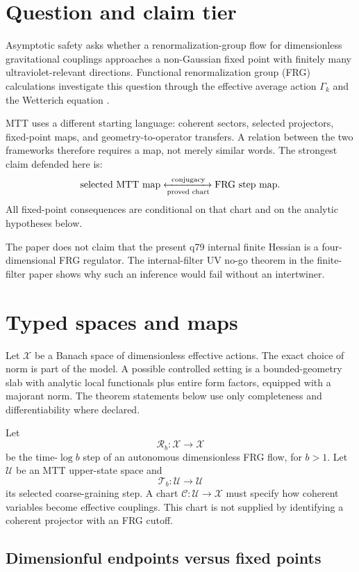 \documentclass[11pt]{article}
\theoremstyle{definition}
\theoremstyle{remark}
\newcommand{\X}{\mathcal X}
\newcommand{\U}{\mathcal U}
\newcommand{\Rmap}{\mathcal R}
\newcommand{\Tmap}{\mathcal T}
\newcommand{\Cmap}{\mathcal C}
\begin{document}
\tableofcontents

\section{Question and claim tier}

Asymptotic safety asks whether a renormalization-group flow for
dimensionless gravitational couplings approaches a non-Gaussian fixed point
with finitely many ultraviolet-relevant directions. Functional
renormalization group (FRG) calculations investigate this question through
the effective average action \(\Gamma_k\) and the Wetterich equation
\cite{Wetterich,Reuter,ReuterSaueressig}.

MTT uses a different starting language: coherent sectors, selected
projectors, fixed-point maps, and geometry-to-operator transfers. A relation
between the two frameworks therefore requires a map, not merely similar
words. The strongest claim defended here is:
\[
\text{selected MTT map}
\xleftrightarrow[\text{proved chart}]{\text{conjugacy}}
\text{FRG step map}.
\]
All fixed-point consequences are conditional on that chart and on the
analytic hypotheses below.

The paper does not claim that the present q79 internal finite Hessian is a
four-dimensional FRG regulator. The internal-filter UV no-go theorem in the
finite-filter paper shows why such an inference would fail without an
intertwiner.

\section{Typed spaces and maps}

Let \(\X\) be a Banach space of dimensionless effective actions. The exact
choice of norm is part of the model. A possible controlled setting is a
bounded-geometry slab with analytic local functionals plus entire form
factors, equipped with a majorant norm. The theorem statements below use
only completeness and differentiability where declared.

Let
\[
 \Rmap_b:\X\longrightarrow\X
\]
be the time-\(\log b\) step of an autonomous dimensionless FRG flow, for
\(b>1\). Let \(\U\) be an MTT upper-state space and
\[
 \Tmap_b:\U\longrightarrow\U
\]
its selected coarse-graining step. A chart
\(\Cmap:\U\to\X\) must specify how coherent variables become effective
couplings. This chart is not supplied by identifying a coherent projector
with an FRG cutoff.

\subsection{Dimensionful endpoints versus fixed points}
\end{document}
